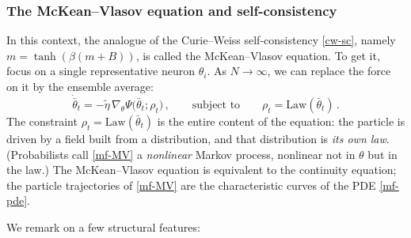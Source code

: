 \documentclass[11pt]{article}
\begin{document}
\subsubsection{The McKean--Vlasov equation and self-consistency}

In this context, the analogue of the Curie--Weiss self-consistency \eqref{cw-sc}, namely $m=\tanh(\beta(m+B))$, is called the McKean--Vlasov equation. To get it, focus on a single representative neuron $\theta_i$. As $N\to \infty$, we can replace the force on it by the ensemble average:
%
\begin{equation} \label{mf-MV}
    \dot{\bar\theta}_t = -\tilde\eta\,\nabla_\theta\Psi\big(\bar\theta_t;\rho_t\big)\,,
    \qquad\text{subject to}\qquad
    \rho_t = \mathrm{Law}(\bar\theta_t)\,.
\end{equation}
%
The constraint $\rho_t = \mathrm{Law}(\bar\theta_t)$ is the entire content of the equation: the particle is driven by a field built from a distribution, and that distribution is \emph{its own law}.
(Probabilists call \eqref{mf-MV} a \emph{nonlinear} Markov process, nonlinear not in $\theta$ but in the law.) The McKean--Vlasov equation is equivalent to the continuity equation; the particle trajectories of \eqref{mf-MV} are the characteristic curves of the PDE \eqref{mf-pde}.

We remark on a few structural features:
\end{document}
